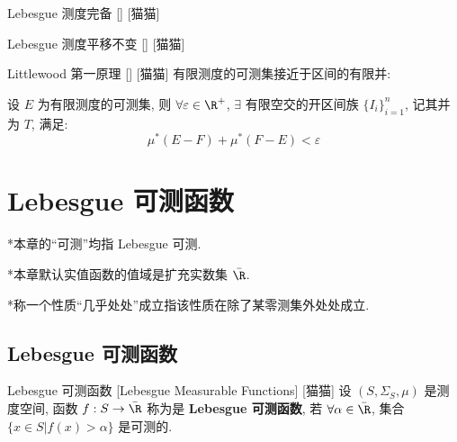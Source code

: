\documentclass[UTF8]{ctexart}
\begin{document}
            \begin{ppt}
                {Lebesgue 测度完备}
                []
                [猫猫]
            \end{ppt}
            
            \begin{ppt}
                {Lebesgue 测度平移不变}
                []
                [猫猫]
            \end{ppt}
            
            \begin{thm}
                {Littlewood 第一原理}
                []
                [猫猫]
                有限测度的可测集接近于区间的有限并: 
                
                设 \(E\) 为有限测度的可测集, 则 \(\forall\varepsilon\in\R^+\), \(\exists\) 有限空交的开区间族 \({\{I_i\}}_{i=1}^n\), 记其并为 \(T\), 满足: 
                \[\mu^*(E-F)+\mu^*(F-E)<\varepsilon\]
            \end{thm}

    \section{Lebesgue 可测函数} %

        *本章的``可测''均指 Lebesgue 可测. 

        *本章默认实值函数的值域是扩充实数集 \(\bar{\R}\). 

        *称一个性质``几乎处处''成立指该性质在除了某零测集外处处成立. 

        \subsection{Lebesgue 可测函数} %

            \begin{dfn}
                {Lebesgue 可测函数}
                [Lebesgue Measurable Functions]
                [猫猫]
                设 \((S,\Sigma_S,\mu)\) 是测度空间, 函数 \(f:S\to\bar{\R}\) 称为是 \textbf{Lebesgue 可测函数}, 若 \(\forall\alpha\in\bar{\R}\), 集合 \(\{x\in S|f(x)>\alpha\}\) 是可测的. 
            \end{dfn}
            
\end{document}

